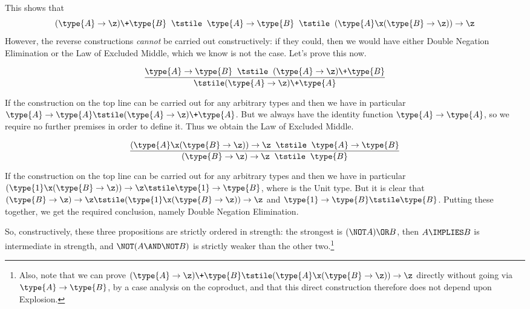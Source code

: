 This shows that
\[
(\type{A} \to \z) \+ \type{B}
\;\;\tstile\;\;
\type{A} \to \type{B}
\;\;\tstile\;\;
(\type{A} \x (\type{B} \to \z)) \to \z
\]
However, the reverse constructions \emph{cannot} be carried out constructively: if they could, then we would have either Double Negation Elimination or the Law of Excluded Middle, which we know is not the case.  Let's prove this now.

\begin{Theorem}
\[
\frac{
\type{A} \to \type{B}
\;\;\tstile\;\;
(\type{A} \to \z) \+ \type{B}
}{
\tstile (\type{A} \to \z) \+ \type{A}
}
\]
\end{Theorem}
\begin{Proof}
If the construction on the top line can be carried out for any arbitrary types  and  then we have in particular
$\type{A} \to \type{A}
\tstile
(\type{A} \to \z) \+ \type{A}$.  But we always have the identity function 
$\type{A} \to \type{A}$, so we require no further premises in order to define it.  Thus we obtain the Law of Excluded Middle.
\end{Proof}


\begin{Theorem}
\[
\frac{
(\type{A} \x (\type{B} \to \z)) \to \z
\;\;\tstile\;\;
\type{A} \to \type{B}
}{
(\type{B} \to \z) \to \z
\;\;\tstile\;\;
\type{B}
}
\]
\end{Theorem}
\begin{Proof}
If the construction on the top line can be carried out for any arbitrary types  and  then we have in particular
$(\type{1} \x (\type{B} \to \z)) \to \z
\tstile
\type{1} \to \type{B}$,
where  is the Unit type.  But it is clear that
$
(\type{B} \to \z) \to \z
\tstile
(\type{1} \x (\type{B} \to \z)) \to \z
$
and
$\type{1} \to \type{B} \tstile \type{B}$.  Putting these together, we get the required conclusion, namely Double Negation Elimination.

\end{Proof}

So, constructively, these three propositions are strictly ordered in strength:  the strongest is $(\NOT A) \OR B$, 
then $A \IMPLIES B$ is intermediate in strength, and 
$\NOT (A \AND \NOT B)$ is strictly weaker than the other two.\footnote{
Also, note that we can prove 
$(\type{A} \to \z) \+ \type{B}
\tstile
(\type{A} \x (\type{B} \to \z)) \to \z$
directly without going via $\type{A} \to \type{B}$, by a case analysis on the coproduct, and that this direct construction therefore does not depend upon Explosion.
}




